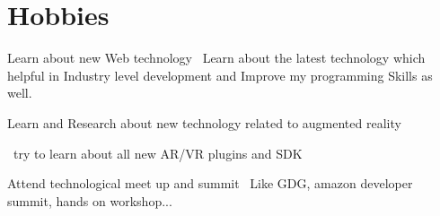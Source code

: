 \documentclass[]{cv-style}          %
\begin{document}


\section{Hobbies}
  \vspace{-0.2cm}

\begin{entrylist}

\entry
  {}
  {Learn about new Web technology }
  {}
  {\jobtitle{}\ Learn about the latest technology which helpful in Industry level development and Improve my programming Skills as well.}
  
  \entry
  {}
  {Learn and Research about new technology related to augmented reality }
  {}
  {\jobtitle{}\ try to learn about all new AR/VR plugins and SDK 
  \begin{itemize}

     
     
  \end{itemize}}
  \entry
  {}
  {Attend technological meet up and summit }
  {}
  {\jobtitle{}\ Like GDG, amazon developer summit, hands on workshop... }
  

\end{entrylist}
\end{document}
